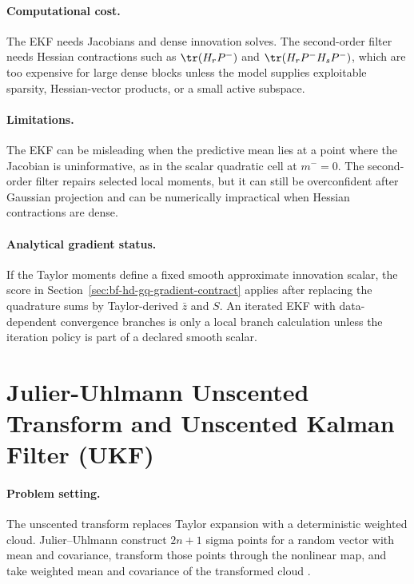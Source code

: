 \paragraph{Computational cost.}
The EKF needs Jacobians and dense innovation solves.  The second-order filter
needs Hessian contractions such as \(\tr(H_rP^-)\) and
\(\tr(H_rP^-H_sP^-)\), which are too expensive for large dense blocks unless
the model supplies exploitable sparsity, Hessian-vector products, or a small
active subspace.

\paragraph{Limitations.}
The EKF can be misleading when the predictive mean lies at a point where the
Jacobian is uninformative, as in the scalar quadratic cell at \(m^-=0\).  The
second-order filter repairs selected local moments, but it can still be
overconfident after Gaussian projection and can be numerically impractical when
Hessian contractions are dense.

\paragraph{Analytical gradient status.}
If the Taylor moments define a fixed smooth approximate innovation scalar, the
score in Section~\ref{sec:bf-hd-gq-gradient-contract} applies after replacing
the quadrature sums by Taylor-derived \(\bar z\) and \(S\).  An iterated EKF
with data-dependent convergence branches is only a local branch calculation
unless the iteration policy is part of a declared smooth scalar.

\section{Julier-Uhlmann Unscented Transform and Unscented Kalman Filter (UKF)}
\label{sec:bf-hd-ukf}

\paragraph{Problem setting.}
The unscented transform replaces Taylor expansion with a deterministic weighted
cloud.  Julier--Uhlmann construct \(2n+1\) sigma points for a random vector with
mean and covariance, transform those points through the nonlinear map, and take
weighted mean and covariance of the transformed cloud
\citep[Eq. 12--14]{julier1997new}.

